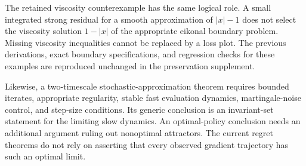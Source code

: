 The retained viscosity counterexample has the same logical role. A small integrated strong residual for a smooth approximation of $|x|-1$ does not select the viscosity solution $1-|x|$ of the appropriate eikonal boundary problem. Missing viscosity inequalities cannot be replaced by a loss plot. The previous derivations, exact boundary specifications, and regression checks for these examples are reproduced unchanged in the preservation supplement.

Likewise, a two-timescale stochastic-approximation theorem requires bounded iterates, appropriate regularity, stable fast evaluation dynamics, martingale-noise control, and step-size conditions. Its generic conclusion is an invariant-set statement for the limiting slow dynamics. An optimal-policy conclusion needs an additional argument ruling out nonoptimal attractors. The current regret theorems do not rely on asserting that every observed gradient trajectory has such an optimal limit.
